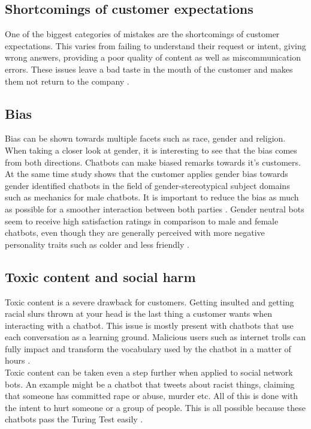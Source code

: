 \subsection{Shortcomings of customer expectations}
One of the biggest categories of mistakes are the shortcomings of customer expectations. This varies from failing to understand their request or intent, giving wrong answers, providing a poor quality of content as well as miscommunication errors. These issues leave a bad taste in the mouth of the customer and makes them not return to the company \citep*{Adamopoulou2020, Duka2021, Nichifor2021, Sheehan2020, Margot}.

\subsection{Bias}
Bias can be shown towards multiple facets such as race, gender and religion. When taking a closer look at gender, it is interesting to see that the bias comes from both directions. Chatbots can make biased remarks towards it's customers. At the same time study shows that the customer applies gender bias towards gender identified chatbots in the field of gender-stereotypical subject domains such as mechanics for male chatbots. It is important to reduce the bias as much as possible for a smoother interaction between both parties \citep*{Adamopoulou2020, McDonnell2019}. Gender neutral bots seem to receive high satisfaction ratings in comparison to male and female chatbots, even though they are generally perceived with more negative personality traits such as colder and less friendly \citep{McDonnell2019}.

\subsection{Toxic content and social harm}
Toxic content is a severe drawback for customers. Getting insulted and getting racial slurs thrown at your head is the last thing a customer wants when interacting with a chatbot. This issue is mostly present with chatbots that use each conversation as a learning ground. Malicious users such as internet trolls can fully impact and transform the vocabulary used by the chatbot in a matter of hours \citep{Adamopoulou2020}.\\
\break
Toxic content can be taken even a step further when applied to social network bots. An example might be a chatbot that tweets about racist things, claiming that someone has committed rape or abuse, murder etc. All of this is done with the intent to hurt someone or a group of people. This is all possible because these chatbots pass the Turing Test easily \citep{Radziwil2021}.

